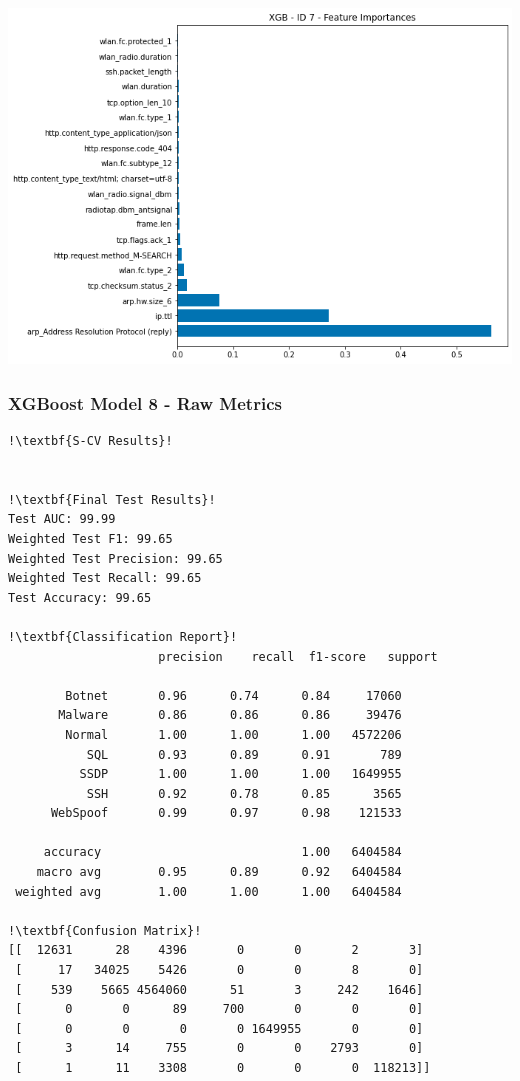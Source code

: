 \begin{appendices}
\begin{lstlisting}[escapechar=!]
\end{lstlisting}
\begin{center}
	\centering
	\includegraphics[width=\textwidth]{Appendices/Images/XGB/Model7/XGB_Model7_FI.png}
\end{center}

\subsubsection{XGBoost Model 8 - Raw Metrics}
\begin{lstlisting}[escapechar=!]
!\textbf{S-CV Results}!


!\textbf{Final Test Results}!
Test AUC: 99.99
Weighted Test F1: 99.65
Weighted Test Precision: 99.65
Weighted Test Recall: 99.65
Test Accuracy: 99.65

!\textbf{Classification Report}!
					 precision    recall  f1-score   support

        Botnet       0.96      0.74      0.84     17060
       Malware       0.86      0.86      0.86     39476
        Normal       1.00      1.00      1.00   4572206
           SQL       0.93      0.89      0.91       789
          SSDP       1.00      1.00      1.00   1649955
           SSH       0.92      0.78      0.85      3565
      WebSpoof       0.99      0.97      0.98    121533

     accuracy                            1.00   6404584
    macro avg        0.95      0.89      0.92   6404584
 weighted avg        1.00      1.00      1.00   6404584
    
!\textbf{Confusion Matrix}!    
[[  12631      28    4396       0       0       2       3]
 [     17   34025    5426       0       0       8       0]
 [    539    5665 4564060      51       3     242    1646]
 [      0       0      89     700       0       0       0]
 [      0       0       0       0 1649955       0       0]
 [      3      14     755       0       0    2793       0]
 [      1      11    3308       0       0       0  118213]]


\end{lstlisting}
\end{appendices}
